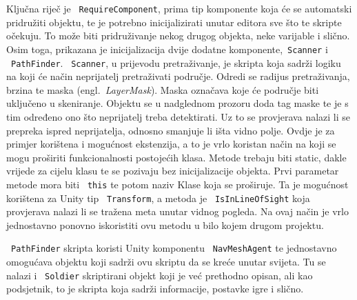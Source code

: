 Ključna riječ je ~\texttt{RequireComponent}, prima tip komponente koja će se automatski
pridružiti objektu, te je potrebno inicijalizirati unutar editora sve što te skripte
očekuju. To može biti pridruživanje nekog drugog objekta, neke varijable i slično.
Osim toga, prikazana je inicijalizacija dvije dodatne komponente,~\texttt{Scanner} i
~\texttt{PathFinder}. ~\texttt{Scanner}, u prijevodu pretraživanje, je skripta koja sadrži logiku na
koji će način neprijatelj pretraživati područje. Odredi se radijus pretraživanja,
brzina te maska (engl.~\textit{LayerMask}). Maska označava koje će područje biti
uključeno u skeniranje. Objektu se u nadglednom prozoru doda tag maske te je s tim
određeno ono što neprijatelj treba detektirati. Uz to se provjerava nalazi li se
prepreka ispred neprijatelja, odnosno smanjuje li išta vidno polje. Ovdje je za
primjer korištena i mogućnost ekstenzija, a to je vrlo koristan način na koji se
mogu proširiti funkcionalnosti postojećih klasa. Metode trebaju biti static, dakle
vrijede za cijelu klasu te se pozivaju bez inicijalizacije objekta. Prvi parametar
metode mora biti ~\texttt{this} te potom naziv Klase koja se proširuje. Ta je
mogućnost korištena za Unity tip ~\texttt{Transform}, a metoda je ~\texttt{IsInLineOfSight} koja
provjerava nalazi li se tražena meta unutar vidnog pogleda. Na ovaj način je vrlo
jednostavno ponovno iskoristiti ovu metodu u bilo kojem drugom projektu. 

~\texttt{PathFinder} skripta koristi Unity komponentu ~\texttt{NavMeshAgent} te jednostavno omogućava
objektu koji sadrži ovu skriptu da se kreće unutar svijeta. 
Tu se nalazi i ~\texttt{Soldier} skriptirani objekt koji je već prethodno opisan, ali kao
podsjetnik, to je skripta koja sadrži informacije, postavke igre i slično. 

